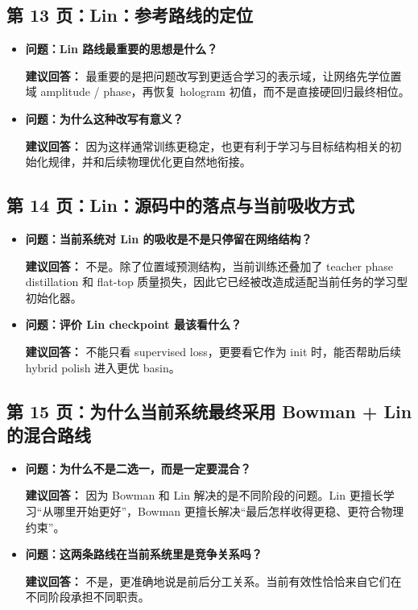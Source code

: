 \documentclass[12pt,a4paper]{ctexart}
\begin{document}
\subsection{第 13 页：Lin：参考路线的定位}
\begin{itemize}
\item \textbf{问题：Lin 路线最重要的思想是什么？}

\textbf{建议回答：} 最重要的是把问题改写到更适合学习的表示域，让网络先学位置域 amplitude / phase，再恢复 hologram 初值，而不是直接硬回归最终相位。

\item \textbf{问题：为什么这种改写有意义？}

\textbf{建议回答：} 因为这样通常训练更稳定，也更有利于学习与目标结构相关的初始化规律，并和后续物理优化更自然地衔接。
\end{itemize}

\subsection{第 14 页：Lin：源码中的落点与当前吸收方式}
\begin{itemize}
\item \textbf{问题：当前系统对 Lin 的吸收是不是只停留在网络结构？}

\textbf{建议回答：} 不是。除了位置域预测结构，当前训练还叠加了 teacher phase distillation 和 flat-top 质量损失，因此它已经被改造成适配当前任务的学习型初始化器。

\item \textbf{问题：评价 Lin checkpoint 最该看什么？}

\textbf{建议回答：} 不能只看 supervised loss，更要看它作为 init 时，能否帮助后续 hybrid polish 进入更优 basin。
\end{itemize}

\subsection{第 15 页：为什么当前系统最终采用 Bowman + Lin 的混合路线}
\begin{itemize}
\item \textbf{问题：为什么不是二选一，而是一定要混合？}

\textbf{建议回答：} 因为 Bowman 和 Lin 解决的是不同阶段的问题。Lin 更擅长学习“从哪里开始更好”，Bowman 更擅长解决“最后怎样收得更稳、更符合物理约束”。

\item \textbf{问题：这两条路线在当前系统里是竞争关系吗？}

\textbf{建议回答：} 不是，更准确地说是前后分工关系。当前有效性恰恰来自它们在不同阶段承担不同职责。
\end{itemize}
\end{document}
